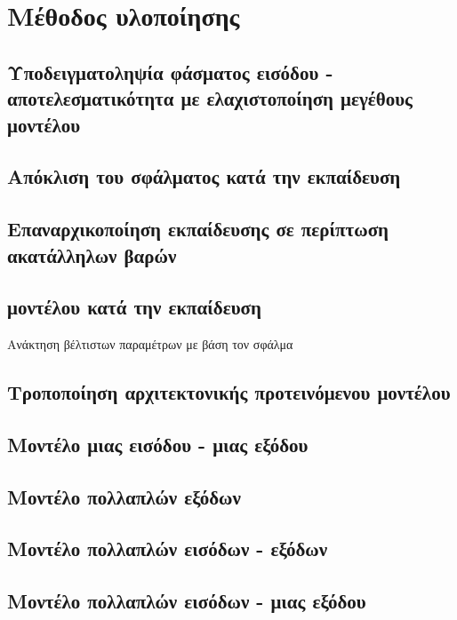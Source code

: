 \chapter{Μέθοδος υλοποίησης}
\label{ch:implementation_method}

\section{Υποδειγματοληψία φάσματος εισόδου - αποτελεσματικότητα με ελαχιστοποίηση μεγέθους μοντέλου}

\section{Απόκλιση του σφάλματος  κατά την εκπαίδευση}

\section{Επαναρχικοποίηση εκπαίδευσης σε περίπτωση ακατάλληλων βαρών}

\section{ μοντέλου κατά την εκπαίδευση}
Ανάκτηση βέλτιστων παραμέτρων με βάση τον σφάλμα 

\section{Τροποποίηση αρχιτεκτονικής προτεινόμενου μοντέλου}

\section{Μοντέλο μιας εισόδου - μιας εξόδου}

\section{Μοντέλο πολλαπλών εξόδων}

\section{Μοντέλο πολλαπλών εισόδων - εξόδων}

\section{Μοντέλο πολλαπλών εισόδων - μιας εξόδου}

